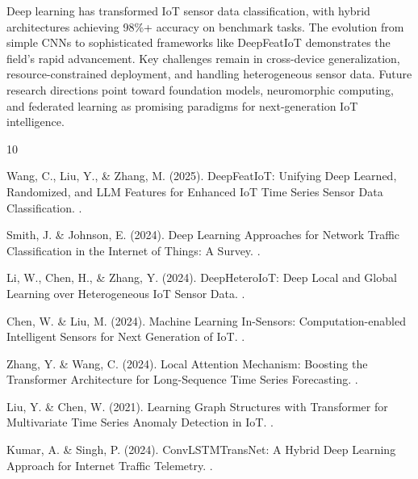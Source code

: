 \documentclass[12pt,a4paper]{article}
\begin{document}
Deep learning has transformed IoT sensor data classification, with hybrid architectures achieving 98\%+ accuracy on benchmark tasks. The evolution from simple CNNs to sophisticated frameworks like DeepFeatIoT demonstrates the field's rapid advancement. Key challenges remain in cross-device generalization, resource-constrained deployment, and handling heterogeneous sensor data. Future research directions point toward foundation models, neuromorphic computing, and federated learning as promising paradigms for next-generation IoT intelligence.


\begin{thebibliography}{10}

Wang, C., Liu, Y., \& Zhang, M. (2025).
\newblock DeepFeatIoT: Unifying Deep Learned, Randomized, and LLM Features for Enhanced IoT Time Series Sensor Data Classification.
.

Smith, J. \& Johnson, E. (2024).
\newblock Deep Learning Approaches for Network Traffic Classification in the Internet of Things: A Survey.
.

Li, W., Chen, H., \& Zhang, Y. (2024).
\newblock DeepHeteroIoT: Deep Local and Global Learning over Heterogeneous IoT Sensor Data.
.

Chen, W. \& Liu, M. (2024).
\newblock Machine Learning In-Sensors: Computation-enabled Intelligent Sensors for Next Generation of IoT.
.

Zhang, Y. \& Wang, C. (2024).
\newblock Local Attention Mechanism: Boosting the Transformer Architecture for Long-Sequence Time Series Forecasting.
.

Liu, Y. \& Chen, W. (2021).
\newblock Learning Graph Structures with Transformer for Multivariate Time Series Anomaly Detection in IoT.
.

Kumar, A. \& Singh, P. (2024).
\newblock ConvLSTMTransNet: A Hybrid Deep Learning Approach for Internet Traffic Telemetry.
.

\end{thebibliography}
\end{document}
